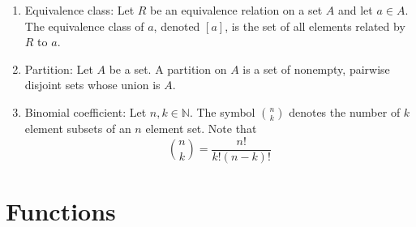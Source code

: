 \documentclass{article}
\begin{document}
\begin{enumerate}
		\item Equivalence class: Let $R$ be an equivalence relation on a set $A$ and let $a\in A$.
		The equivalence class of $a$, denoted $[a]$, is the set of all elements related by $R$ to $a$.
		
		\item Partition: Let $A$ be a set.
		A partition on $A$ is a set of nonempty, pairwise disjoint sets whose union is $A$.
		
		\item Binomial coefficient: Let $n,k\in\mathbb{N}$.
		The symbol ${n\choose k}$ denotes the number of $k$ element subsets of an $n$ element set. Note that
		\[
		    {n\choose k}=\frac{n!}{k!(n-k)!}
		\]
	
	\end{enumerate}
	
	\section*{Functions}
	
\end{document}
